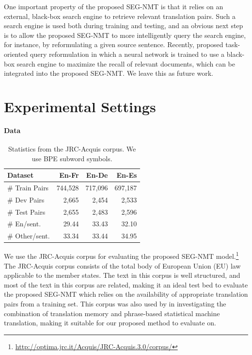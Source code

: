 One important property of the proposed SEG-NMT is that it relies on an external, black-box search engine to retrieve relevant translation pairs. Such a search engine is used both during training and testing, and an obvious next step is to allow the proposed SEG-NMT to more intelligently query the search engine, for instance, by reformulating a given source sentence. Recently, \cite{nogueira2017task} proposed task-oriented query reformulation in which a neural network is trained to use a black-box search engine to maximize the recall of relevant documents, which can be integrated into the proposed SEG-NMT. We leave this as future work.

\section{Experimental Settings}
\paragraph{Data}

\begin{table}
\small
\centering
\begin{tabular}{l|r|r|r}
\toprule
 Dataset& En-Fr & En-De  & En-Es\\
\midrule
\# Train Pairs &744,528 &717,096 &697,187 \\
\# Dev Pairs &2,665 &2,454 &2,533  \\
\# Test Pairs &2,655 &2,483 &2,596  \\
\midrule
\# En/sent. &29.44&33.43 &32.10  \\
\# Other/sent. &33.34 &33.44 &34.95  \\
\bottomrule
\end{tabular} \vspace{-2pt}
\caption{\label{table.dataset} Statistics from the JRC-Acquis corpus. We use BPE subword symbols.}
\vspace{-4mm}
\end{table}


We use the JRC-Acquis corpus\citep{steinberger2006jrc} for evaluating the proposed SEG-NMT model.\footnote{
\url{http://optima.jrc.it/Acquis/JRC-Acquis.3.0/corpus/}
} The JRC-Acquis corpus consists of the total body of European Union (EU) law applicable to the member states. The text in this corpus is well structured, and most of the text in this corpus are related, making it an ideal test bed to evaluate the proposed SEG-NMT which relies on the availability of appropriate translation pairs from a training set. This corpus was also used by \citep{li2016phrase} in investigating the combination of translation memory and phrase-based statistical machine translation, making it suitable for our proposed method to evaluate on. 


